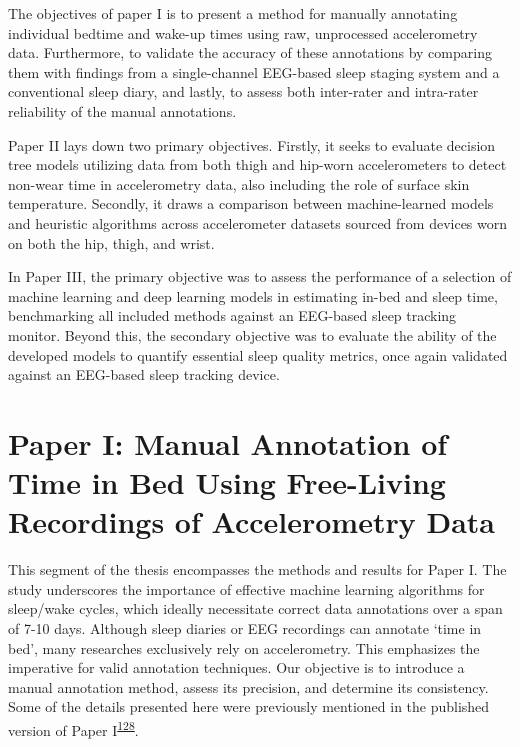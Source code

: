\documentclass[
  10pt,
]{scrbook}
\begin{document}
The objectives of paper I is to present a method for manually annotating
individual bedtime and wake-up times using raw, unprocessed
accelerometry data. Furthermore, to validate the accuracy of these
annotations by comparing them with findings from a single-channel
EEG-based sleep staging system and a conventional sleep diary, and
lastly, to assess both inter-rater and intra-rater reliability of the
manual annotations.

Paper II lays down two primary objectives. Firstly, it seeks to evaluate
decision tree models utilizing data from both thigh and hip-worn
accelerometers to detect non-wear time in accelerometry data, also
including the role of surface skin temperature. Secondly, it draws a
comparison between machine-learned models and heuristic algorithms
across accelerometer datasets sourced from devices worn on both the hip,
thigh, and wrist.

In Paper III, the primary objective was to assess the performance of a
selection of machine learning and deep learning models in estimating
in-bed and sleep time, benchmarking all included methods against an
EEG-based sleep tracking monitor. Beyond this, the secondary objective
was to evaluate the ability of the developed models to quantify
essential sleep quality metrics, once again validated against an
EEG-based sleep tracking device.

\hypertarget{paper-i-manual-annotation-of-time-in-bed-using-free-living-recordings-of-accelerometry-data}{%
\chapter{Paper I: Manual Annotation of Time in Bed Using Free-Living
Recordings of Accelerometry
Data}\label{paper-i-manual-annotation-of-time-in-bed-using-free-living-recordings-of-accelerometry-data}}

This segment of the thesis encompasses the methods and results for Paper
I. The study underscores the importance of effective machine learning
algorithms for sleep/wake cycles, which ideally necessitate correct data
annotations over a span of 7-10 days. Although sleep diaries or EEG
recordings can annotate `time in bed', many researches exclusively rely
on accelerometry. This emphasizes the imperative for valid annotation
techniques. Our objective is to introduce a manual annotation method,
assess its precision, and determine its consistency. Some of the details
presented here were previously mentioned in the published version of
Paper
I\textsuperscript{\protect\hyperlink{ref-skovgaard_manual_2021}{128}}.
\end{document}

